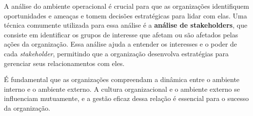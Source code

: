 A análise do ambiente operacional é crucial para que as organizações identifiquem oportunidades e ameaças e tomem decisões estratégicas para lidar com elas. Uma técnica comumente utilizada para essa análise é a \textbf{análise de stakeholders}, que consiste em identificar os grupos de interesse que afetam ou são afetados pelas ações da organização. Essa análise ajuda a entender os interesses e o poder de cada \textit{stakeholder}, permitindo que a organização desenvolva estratégias para gerenciar seus relacionamentos com eles.

É fundamental que as organizações compreendam a dinâmica entre o ambiente interno e o ambiente externo. A cultura organizacional e o ambiente externo se influenciam mutuamente, e a gestão eficaz dessa relação é essencial para o sucesso da organização.
